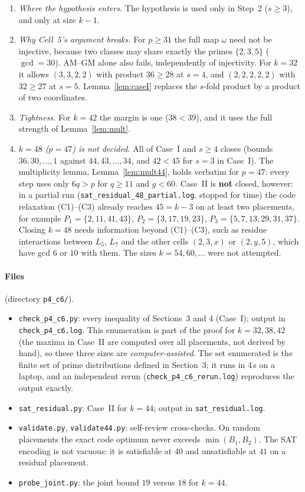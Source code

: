 \documentclass[11pt]{article}
\theoremstyle{definition}
\theoremstyle{remark}
\begin{document}
\begin{enumerate}
\item \emph{Where the hypothesis enters.} The hypothesis is used only in Step~2 ($s\ge3$), and
  only at size $k-1$.
\item \emph{Why Cell~5's argument breaks.} For $p\ge31$ the full map $\omega$ need not be
  injective, because two classes may share exactly the primes $\{2,3,5\}$ ($\gcd=30$).
  AM--GM alone also fails, independently of injectivity. For $k=32$ it allows $(3,3,2,2)$ with
  product $36\ge28$ at $s=4$, and $(2,2,2,2,2)$ with $32\ge27$ at $s=5$. Lemma~\ref{lem:caseI}
  replaces the $s$-fold product by a product of two coordinates.
\item \emph{Tightness.} For $k=42$ the margin is one ($38<39$), and it uses the full strength of
  Lemma~\ref{lem:mult}.
\item \label{rem:48}\emph{$k=48$ ($p=47$) is not decided.} All of Case~I and $s\ge4$ closes (bounds
  $36,30,\dots,1$ against $44,43,\dots,34$, and $42<45$ for $s=3$ in Case~I). The multiplicity
  lemma, Lemma~\ref{lem:mult44}, holds verbatim for $p=47$: every step uses only $6q>p$ for
  $q\ge11$ and $g<60$. Case~II is \textbf{not} closed, however: in a partial run
  (\texttt{sat\_residual\_48\_partial.log}, stopped for time) the code relaxation (C1)--(C3)
  already reaches $45=k-3$ on at least two placements, for example $P_1=\{2,11,41,43\}$,
  $P_2=\{3,17,19,23\}$, $P_3=\{5,7,13,29,31,37\}$. Closing $k=48$ needs information
  beyond (C1)--(C3), such as residue interactions between $L_5$, $L_7$ and the other cells
  $(2,3,x)$ or $(2,y,5)$, which have gcd $6$ or $10$ with them. The sizes $k=54,60,\dots$
  were not attempted.
\end{enumerate}

\paragraph{Files} (directory \texttt{p4\_c6/}).
\begin{itemize}
\item \texttt{check\_p4\_c6.py}: every inequality of Sections~3 and 4 (Case~I);
  output in \texttt{check\_p4\_c6.log}. This enumeration is part of the proof for $k=32,38,42$
  (the maxima in Case~II are computed over all placements, not derived by hand), so these three
  sizes are \emph{computer-assisted}. The set enumerated is the finite set of prime distributions
  defined in Section~3; it runs in 4\,s on a laptop, and an independent rerun
  (\texttt{check\_p4\_c6\_rerun.log}) reproduces the output exactly.
\item \texttt{sat\_residual.py}: Case~II for $k=44$; output in \texttt{sat\_residual.log}.
\item \texttt{validate.py}, \texttt{validate44.py}: self-review cross-checks. On random placements
  the exact code optimum never exceeds $\min(B_1,B_2)$. The SAT encoding is not vacuous: it is
  satisfiable at $40$ and unsatisfiable at $41$ on a residual placement.
\item \texttt{probe\_joint.py}: the joint bound $19$ versus $18$ for $k=44$.
\end{itemize}
\end{document}
